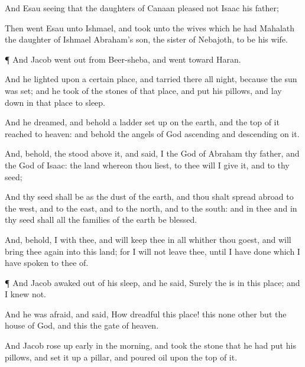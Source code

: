 {And
Esau
seeing that the
daughters of
Canaan
pleased
not
Isaac his
father;

Then
went
Esau unto
Ishmael, and
took unto the
wives which he had
Mahalath the
daughter of
Ishmael
Abraham’s
son, the
sister of
Nebajoth, to be his
wife.


\par }{\PP {}¶ And
Jacob went
out from
Beer-sheba, and
went toward
Haran.

And he
lighted upon a certain
place, and tarried there all
night, because the
sun was
set; and he
took of the
stones of that
place, and
put
{} his
pillows, and lay
down in that
place to
sleep.

And he
dreamed, and behold a
ladder set
up on the
earth, and the top of
it
reached to
heaven: and behold the
angels of
God
ascending and
descending on it.

And, behold, the
{}
stood above it, and
said, I
{} the
{}
God of
Abraham thy
father, and the
God of
Isaac: the
land whereon thou
liest, to thee will I give
it, and to thy
seed;

And thy
seed shall be as the
dust of the
earth, and thou shalt spread
abroad to the
west, and to the
east, and to the
north, and to the
south: and in thee and in thy
seed shall all the
families of the
earth be
blessed.

And, behold, I
{} with thee, and will
keep thee in all
{}
whither thou
goest, and will bring thee
again into this
land; for I will not
leave thee,
until I have
done
{} which I have
spoken to thee of.


\par }{\PP {}¶ And
Jacob
awaked out of his
sleep, and he
said,
Surely the
{}
is in this
place; and I
knew
{} not.

And he was
afraid, and
said, How
dreadful
{} this
place! this
{} none other but the
house of
God, and this
{} the
gate of
heaven.

And
Jacob rose up
early in the
morning, and
took the
stone that he had
put
{} his
pillows, and set it
up
{} a
pillar, and
poured
oil upon the top of
it.

}
